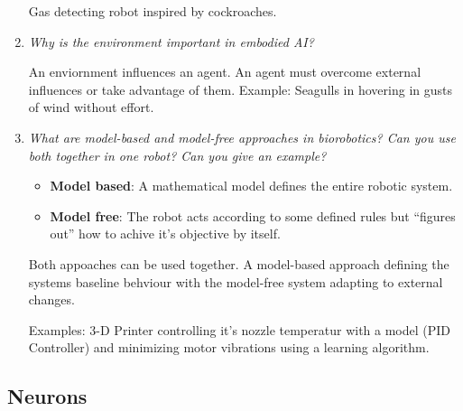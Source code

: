 \documentclass[
    fontsize      = 11pt,
    paper         = a4,
    twoside       = false,
    parskip       = half,
    pagesize      = false,
]{scrartcl}
\providecommand{\tightlist}{%
  \setlength{\itemsep}{0pt}\setlength{\parskip}{0pt}}
\begin{document}
\begin{enumerate}
  Gas detecting robot inspired by cockroaches.
\item
  \emph{Why is the environment important in embodied AI?}

  An enviornment influences an agent. An agent must overcome external
  influences or take advantage of them. Example: Seagulls in hovering in
  gusts of wind without effort.
\item
  \emph{What are model-based and model-free approaches in biorobotics?
  Can you use both together in one robot? Can you give an example?}

  \begin{itemize}
  \tightlist
  \item
    \textbf{Model based}: A mathematical model defines the entire
    robotic system.
  \item
    \textbf{Model free}: The robot acts according to some defined rules
    but ``figures out'' how to achive it's objective by itself.
  \end{itemize}

  Both appoaches can be used together. A model-based approach defining
  the systems baseline behviour with the model-free system adapting to
  external changes.

  Examples: 3-D Printer controlling it's nozzle temperatur with a model
  (PID Controller) and minimizing motor vibrations using a learning
  algorithm.
\end{enumerate}

\hypertarget{neurons}{%
\subsection{Neurons}\label{neurons}}
\end{document}
